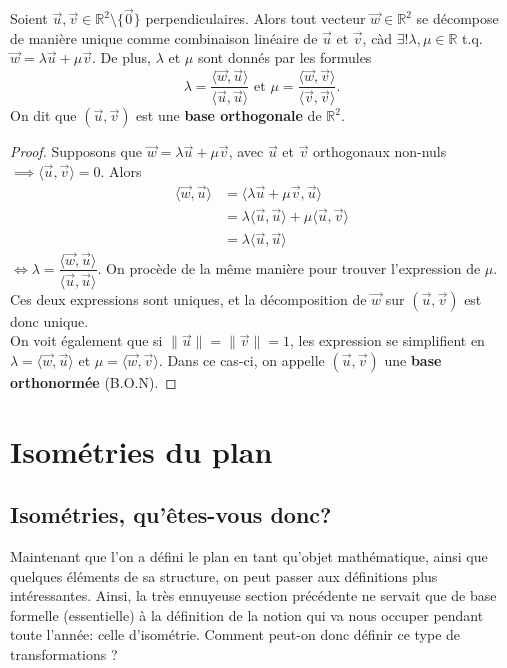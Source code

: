 \documentclass{book}
\numberwithin{equation}{section}
\providecommand{\plan}{{\mathbb R^2}}
\providecommand{\origin}{{\vec 0}}
\providecommand{\longueur}[1]{{\lVert#1\rVert}}
\providecommand{\scalaire}[1]{{\langle#1\rangle}}
\begin{document}
\begin{prop}
	Soient $\vec u, \vec v \in \plan \setminus \{\origin\}$ perpendiculaires. Alors tout vecteur $\vec w \in \plan$ se décompose de manière unique comme combinaison linéaire de $\vec u$ et $\vec v$, càd $\exists! \lambda, \mu \in \mathbb R$ t.q. $\vec w = \lambda \vec u + \mu \vec v$. De plus, $\lambda$ et $\mu$ sont donnés par les formules
	\begin{equation*}
		\lambda = \frac{\scalaire{\vec w, \vec u}}{\scalaire{\vec u, \vec u}} \text{ et } \mu = \frac{\scalaire{\vec w, \vec v}}{\scalaire{\vec v, \vec v}}.
	\end{equation*}
	On dit que $(\vec u, \vec v)$ est une \textbf{base orthogonale} de $\plan$.
\end{prop}
\begin{proof}
	Supposons que $\vec w = \lambda \vec u + \mu \vec v$, avec $\vec u$ et $\vec v$ orthogonaux non-nuls $\implies \scalaire{\vec u, \vec v} = 0$. Alors
	\begin{align*}
	\scalaire{\vec w, \vec u} &= \scalaire{\lambda \vec u + \mu \vec v, \vec u}\\
	&= \lambda\scalaire{\vec u, \vec u} + \mu\scalaire{\vec u, \vec v}\\
	&= \lambda\scalaire{\vec u, \vec u}
	\end{align*}
	$\iff \lambda = \dfrac{\scalaire{\vec w, \vec u}}{\scalaire{\vec u, \vec u}}$. On procède de la même manière pour trouver l'expression de $\mu$. Ces deux expressions sont uniques, et la décomposition de $\vec w$ sur $(\vec u, \vec v)$ est donc unique.\\
	On voit également que si $\longueur{\vec u} = \longueur{\vec v} = 1$, les expression se simplifient en $\lambda = \scalaire{\vec w, \vec u}$ et $\mu = \scalaire{\vec w, \vec v}$. Dans ce cas-ci, on appelle $(\vec u, \vec v)$ une \textbf{base orthonormée} (B.O.N).
\end{proof}

\chapter{Isométries du plan}

\section{Isométries, qu'êtes-vous donc?}
Maintenant que l'on a défini le plan en tant qu'objet mathématique, ainsi que quelques éléments de sa structure, on peut passer aux définitions plus intéressantes. Ainsi, la très ennuyeuse section précédente ne servait que de base formelle (essentielle) à la définition de la notion qui va nous occuper pendant toute l'année: celle d'isométrie. Comment peut-on donc définir ce type de transformations ?
\end{document}

